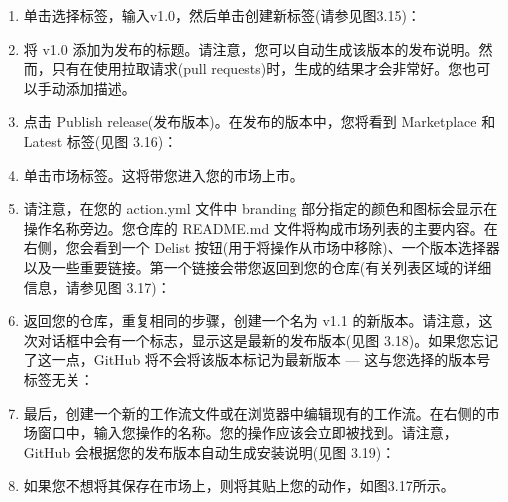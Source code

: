 \begin{enumerate}
\item 
单击选择标签，输入v1.0，然后单击创建新标签(请参见图3.15)：


\item 
将 v1.0 添加为发布的标题。请注意，您可以自动生成该版本的发布说明。然而，只有在使用拉取请求(pull requests)时，生成的结果才会非常好。您也可以手动添加描述。

\item 
点击 Publish release(发布版本)。在发布的版本中，您将看到 Marketplace 和 Latest 标签(见图 3.16)：


\item 
单击市场标签。这将带您进入您的市场上市。

\item 
请注意，在您的 action.yml 文件中 branding 部分指定的颜色和图标会显示在操作名称旁边。您仓库的 README.md 文件将构成市场列表的主要内容。在右侧，您会看到一个 Delist 按钮(用于将操作从市场中移除)、一个版本选择器以及一些重要链接。第一个链接会带您返回到您的仓库(有关列表区域的详细信息，请参见图 3.17)：


\item 
返回您的仓库，重复相同的步骤，创建一个名为 v1.1 的新版本。请注意，这次对话框中会有一个标志，显示这是最新的发布版本(见图 3.18)。如果您忘记了这一点，GitHub 将不会将该版本标记为最新版本 --- 这与您选择的版本号标签无关：


\item 
最后，创建一个新的工作流文件或在浏览器中编辑现有的工作流。在右侧的市场窗口中，输入您操作的名称。您的操作应该会立即被找到。请注意，GitHub 会根据您的发布版本自动生成安装说明(见图 3.19)：


\item 
如果您不想将其保存在市场上，则将其贴上您的动作，如图3.17所示。
\end{enumerate}


